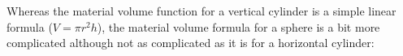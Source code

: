 Whereas the material volume function for a vertical cylinder is a simple linear formula ($V = \pi r^2 h$), the material volume formula for a sphere is a bit more complicated although not as complicated as it is for a horizontal cylinder:

















